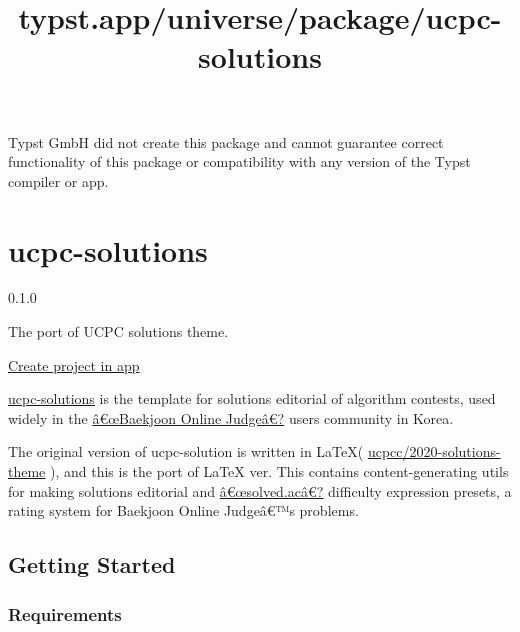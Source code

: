 Typst GmbH did not create this package and cannot guarantee correct
functionality of this package or compatibility with any version of the
Typst compiler or app.


\title{typst.app/universe/package/ucpc-solutions}

\label{banner}
\label{template-thumbnail}

\section{ucpc-solutions}\label{ucpc-solutions}

{ 0.1.0 }

The port of UCPC solutions theme.

\href{/app?template=ucpc-solutions&version=0.1.0}{Create project in app}

\label{readme}
\href{https://github.com/ShapeLayer/ucpc-solutions__typst}{ucpc-solutions}
is the template for solutions editorial of algorithm contests, used
widely in the \href{https://acmicpc.net/}{â€œBaekjoon Online Judgeâ€?}
users community in Korea.

The original version of ucpc-solution is written in LaTeX(
\href{https://github.com/ucpcc/2020-solutions-theme}{ucpcc/2020-solutions-theme}
), and this is the port of LaTeX ver. This contains content-generating
utils for making solutions editorial and
\href{https://solved.ac/}{â€œsolved.acâ€?} difficulty expression
presets, a rating system for Baekjoon Online Judgeâ€™s problems.

\subsection{Getting Started}\label{getting-started}

\begin{Shaded}
\begin{Highlighting}[]

\NormalTok{)}
\end{Highlighting}
\end{Shaded}

\subsubsection{Requirements}\label{requirements}

